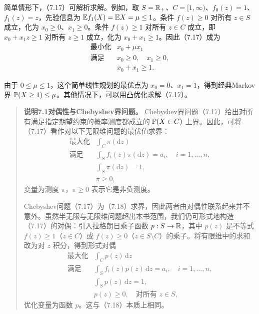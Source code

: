 简单情形下，（7.17）可解析求解。例如，取 $S=\mathbb R_+$、$C=[1,\infty)$、$f_0(z)=1$、$f_1(z)=z$，先验信息为 $\mathbb E f_1(X)=\mathbb E X=\mu\le1$。条件 $f(z)\ge0$ 对所有 $z\in S$ 成立，化为 $x_0\ge0$、$x_1\ge0$。条件 $f(z)\ge1$ 对所有 $z\in C$ 成立，即 $x_0+x_1z\ge1$ 对所有 $z\ge1$ 成立，化为 $x_0+x_1\ge1$。因此（7.17）成为
\[
\begin{array}{ll}
\text{最小化}&x_0+\mu x_1\\
\text{满足}&x_0\ge0,\quad x_1\ge0,\\
&x_0+x_1\ge1.
\end{array}
\]

由于 $0\le\mu\le1$，这个简单线性规划的最优点为 $x_0=0$、$x_1=1$，得到经典Markov界 $\mathbb P(X\ge1)\le\mu$。其他情况下，可以用凸优化求解（7.17）。

\begin{quote}\textbf{说明7.1\quad 对偶性与Chebyshev界问题。}
Chebyshev界问题（7.17）给出对所有满足指定期望约束的概率测度都成立的 $\mathbb P(X\in C)$ 上界。因此，可将（7.17）看作对以下无限维问题的最优值求界：
\begin{equation}
\begin{array}{ll}
\text{最大化}&\displaystyle\int_C\pi(\mathrm dz)\\
\text{满足}&\displaystyle\int_S f_i(z)\pi(\mathrm dz)=a_i,\quad i=1,\ldots,n,\\
&\displaystyle\int_S\pi(\mathrm dz)=1,\\
&\pi\ge0,
\end{array}\tag{7.18}
\end{equation}
变量为测度 $\pi$，$\pi\ge0$ 表示它是非负测度。

Chebyshev问题（7.17）为（7.18）求界，因此两者由对偶性联系起来并不意外。虽然半无限与无限维问题超出本书范围，我们仍可形式地构造（7.17）的对偶：引入拉格朗日乘子函数 $p:S\to\mathbb R$，其中 $p(z)$ 是不等式 $f(z)\ge1$（$z\in C$）或 $f(z)\ge0$（$z\in S\setminus C$）的乘子。将有限维中的求和改为对 $z$ 积分，得到形式对偶
\[
\begin{array}{ll}
\text{最大化}&\displaystyle\int_Cp(z)\,\mathrm dz\\
\text{满足}&\displaystyle\int_Sf_i(z)p(z)\,\mathrm dz=a_i,\quad i=1,\ldots,n,\\
&\displaystyle\int_Sp(z)\,\mathrm dz=1,\\
&p(z)\ge0,\quad\text{对所有 }z\in S,
\end{array}
\]
优化变量为函数 $p$。这与（7.18）本质上相同。
\end{quote}

